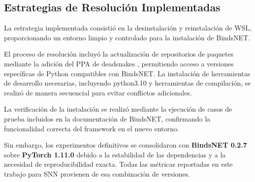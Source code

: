\subsection{Estrategias de Resolución Implementadas}

La estrategia implementada consistió en la desinstalación y reinstalación de WSL, proporcionando un entorno limpio y controlado para la instalación de BindsNET.

El proceso de resolución incluyó la actualización de repositorios de paquetes mediante la adición del PPA de deadsnakes \cite{deadsnakes2025}, permitiendo acceso a versiones específicas de Python compatibles con BindsNET. La instalación de herramientas de desarrollo necesarias, incluyendo python3.10 y herramientas de compilación, se realizó de manera secuencial para evitar conflictos adicionales.

La verificación de la instalación se realizó mediante la ejecución de casos de prueba incluidos en la documentación de BindsNET, confirmando la funcionalidad correcta del framework en el nuevo entorno.

Sin embargo, los experimentos definitivos se consolidaron con \textbf{BindsNET 0.2.7} sobre \textbf{PyTorch 1.11.0} debido a la estabilidad de las dependencias y a la necesidad de reproducibilidad exacta. Todas las métricas reportadas en este trabajo para SNN provienen de esa combinación de versiones.